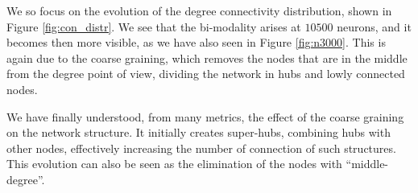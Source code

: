We so focus on the evolution of the degree connectivity distribution, shown in Figure \ref{fig:con_distr}.
We see that the bi-modality arises at $10500$ neurons, and it becomes then more 
visible, as we have also seen in Figure \ref{fig:n3000}. This is again due to the coarse graining, which
removes the nodes that are in the middle from the degree point of view, dividing the network in hubs
and lowly connected nodes.

We have finally understood, from many metrics, the effect of the coarse graining on the network structure.
It initially creates super-hubs, combining hubs with other nodes, effectively increasing the number of 
connection of such structures. This evolution can also be seen as the elimination of the nodes with “middle-degree”.